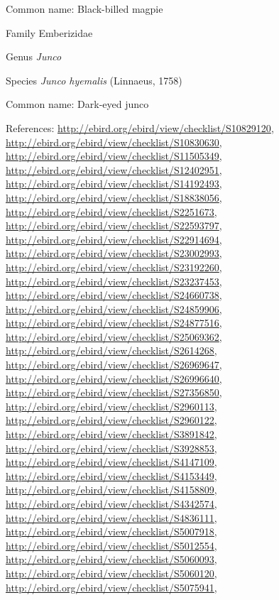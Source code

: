 \documentclass[9pt, article]{memoir}
\begin{document}
\begin{multicols}{2}
Common name: Black-billed magpie

\vspace{6pt}\noindent\hspace{24pt}Family Emberizidae


\vspace{6pt}\noindent\hspace{30pt}Genus \textit{Junco}


\vspace{6pt}\noindent\hspace{36pt}Species \textit{Junco hyemalis} (Linnaeus, 1758)


Common name: Dark-eyed junco

References: 
\url{http://ebird.org/ebird/view/checklist/S10829120}, 
\url{http://ebird.org/ebird/view/checklist/S10830630}, 
\url{http://ebird.org/ebird/view/checklist/S11505349}, 
\url{http://ebird.org/ebird/view/checklist/S12402951}, 
\url{http://ebird.org/ebird/view/checklist/S14192493}, 
\url{http://ebird.org/ebird/view/checklist/S18838056}, 
\url{http://ebird.org/ebird/view/checklist/S2251673}, 
\url{http://ebird.org/ebird/view/checklist/S22593797}, 
\url{http://ebird.org/ebird/view/checklist/S22914694}, 
\url{http://ebird.org/ebird/view/checklist/S23002993}, 
\url{http://ebird.org/ebird/view/checklist/S23192260}, 
\url{http://ebird.org/ebird/view/checklist/S23237453}, 
\url{http://ebird.org/ebird/view/checklist/S24660738}, 
\url{http://ebird.org/ebird/view/checklist/S24859906}, 
\url{http://ebird.org/ebird/view/checklist/S24877516}, 
\url{http://ebird.org/ebird/view/checklist/S25069362}, 
\url{http://ebird.org/ebird/view/checklist/S2614268}, 
\url{http://ebird.org/ebird/view/checklist/S26969647}, 
\url{http://ebird.org/ebird/view/checklist/S26996640}, 
\url{http://ebird.org/ebird/view/checklist/S27356850}, 
\url{http://ebird.org/ebird/view/checklist/S2960113}, 
\url{http://ebird.org/ebird/view/checklist/S2960122}, 
\url{http://ebird.org/ebird/view/checklist/S3891842}, 
\url{http://ebird.org/ebird/view/checklist/S3928853}, 
\url{http://ebird.org/ebird/view/checklist/S4147109}, 
\url{http://ebird.org/ebird/view/checklist/S4153449}, 
\url{http://ebird.org/ebird/view/checklist/S4158809}, 
\url{http://ebird.org/ebird/view/checklist/S4342574}, 
\url{http://ebird.org/ebird/view/checklist/S4836111}, 
\url{http://ebird.org/ebird/view/checklist/S5007918}, 
\url{http://ebird.org/ebird/view/checklist/S5012554}, 
\url{http://ebird.org/ebird/view/checklist/S5060093}, 
\url{http://ebird.org/ebird/view/checklist/S5060120}, 
\url{http://ebird.org/ebird/view/checklist/S5075941}, 

\end{multicols}
\end{document}
